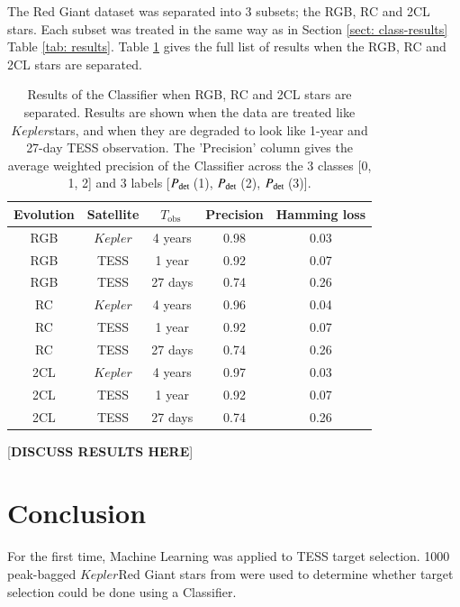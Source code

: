 \documentclass[a4paper,fleqn,usenatbib,useAMS]{mnras}
\newcommand{\kep}{\ensuremath{Kepler}\:}
\newcommand{\pdet}{\ensuremath{P_{\rm det}\:}}
\newcommand{\tobs}{\ensuremath{T_{\textrm{obs}}\:}}
\begin{document}
The Red Giant dataset was separated into 3 subsets; the RGB, RC and 2CL stars. Each subset was treated in the same way as in Section \ref{sect: class-results} Table \ref{tab: results}. Table \ref{tab: evo results} gives the full list of results when the RGB, RC and 2CL stars are separated. 
\begin{table}
\begin{center}
\begin{tabular}{ |c|c|c|c|c| }
Evolution & Satellite & \tobs   & Precision & Hamming loss \\
\hline
RGB       & \kep      & 4 years & 0.98      & 0.03         \\
RGB       & TESS      & 1 year  & 0.92      & 0.07         \\
RGB       & TESS      & 27 days & 0.74      & 0.26         \\
\hline
RC        & \kep      & 4 years & 0.96      & 0.04         \\
RC        & TESS      & 1 year  & 0.92      & 0.07         \\
RC        & TESS      & 27 days & 0.74      & 0.26         \\
\hline
2CL       & \kep      & 4 years & 0.97      & 0.03         \\
2CL       & TESS      & 1 year  & 0.92      & 0.07         \\
2CL       & TESS      & 27 days & 0.74      & 0.26         \\
\end{tabular}
\end{center}
\caption{Results of the Classifier when RGB, RC and 2CL stars are separated. Results are shown when the data are treated like \kep stars, and when they are degraded to look like 1-year and 27-day TESS observation. The 'Precision' column gives the average weighted precision of the Classifier across the 3 classes [0, 1, 2] and 3 labels [\pdet(1), \pdet(2), \pdet(3)].}
\label{tab: evo results}
\end{table}

[{\bf DISCUSS RESULTS HERE}]



\section{Conclusion}
\label{sect: conc}

For the first time, Machine Learning was applied to TESS target selection. 1000 peak-bagged \kep Red Giant stars from \citet{davies_asteroseismology_2016} were used to determine whether target selection could be done using a Classifier.
\end{document}
